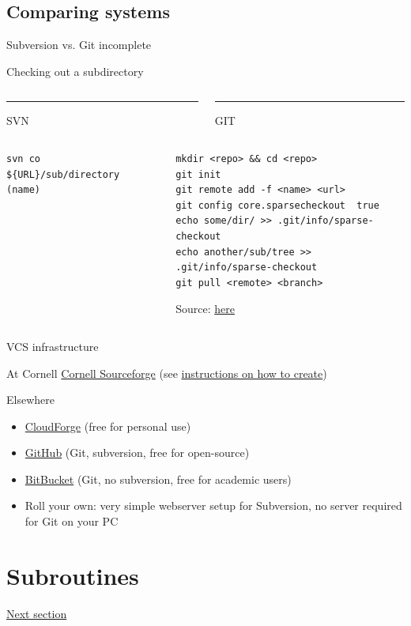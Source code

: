 \documentclass[xcolor=table,compress]{beamer}
\begin{document}
\subsection{Comparing systems}
\begin{frame}[fragile]{Subversion vs. Git}
\small
incomplete
\begin{block}{Checking out a subdirectory}
\begin{columns}
\begin{column}{.48\textwidth}
\color{red}\rule{\linewidth}{4pt}

SVN
\end{column}%
\hfill%
\begin{column}{.48\textwidth}
\color{blue}\rule{\linewidth}{4pt}

GIT
\end{column}%
\end{columns}
\begin{columns}
\begin{column}{.48\textwidth}
\color{red}
\begin{lstlisting}
svn co ${URL}/sub/directory (name)
\end{lstlisting}
\end{column}%
\hfill%
\begin{column}{.48\textwidth}
\color{blue}\tiny
\begin{lstlisting}
mkdir <repo> && cd <repo>
git init
git remote add -f <name> <url>
git config core.sparsecheckout  true
echo some/dir/ >> .git/info/sparse-checkout
echo another/sub/tree >>  .git/info/sparse-checkout
git pull <remote> <branch>
\end{lstlisting}
{\tiny Source: \href{http://jasonkarns.com/blog/subdirectory-checkouts-with-git-sparse-checkout/}{here}}
\end{column}%

\end{columns}
\end{block}
\end{frame}


\begin{frame}{VCS infrastructure}
\begin{block}{At Cornell}
\href{https://forge.cornell.edu/sf/sfmain/do/home}{Cornell Sourceforge} (see \href{http://www.it.cornell.edu/services/subversion/howto/create.cfm}{instructions on how to create})
\end{block}
\begin{block}{Elsewhere}
\begin{itemize}
\item \href{http://app.cloudforge.com}{CloudForge} (free for personal use)
\item \href{https://github.com/plans}{GitHub} (Git, subversion, free for open-source)
\item \href{http://bitbucket.org/}{BitBucket} (Git, no subversion, free for academic users)
\item Roll your own: very simple webserver setup for Subversion, no server required for Git on your PC
\end{itemize}
\end{block}
\end{frame}




\section{Subroutines}
\begin{frame}
\href{day1-3.pdf}{Next section}
\end{frame}
\end{document}
